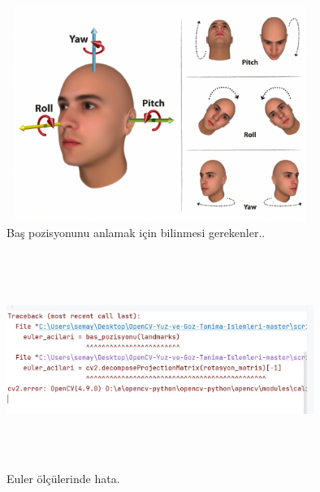 \documentclass[12pt, a4paper]{article}
\begin{document}
	\begin{figure}[htbp]
		\centering
		\includegraphics[width=10cm, height=7cm, keepaspectratio]{poz.png}
		\caption{Baş pozisyonunu anlamak için bilinmesi gerekenler.\cite{headpos}.}
	\end{figure}
	
	\begin{figure}[htbp]
		\centering
		\includegraphics[width=10cm, height=7cm, keepaspectratio]{bashata.jpg}
		\caption{Euler ölçülerinde hata.}
	\end{figure}\newpage
\end{document}
